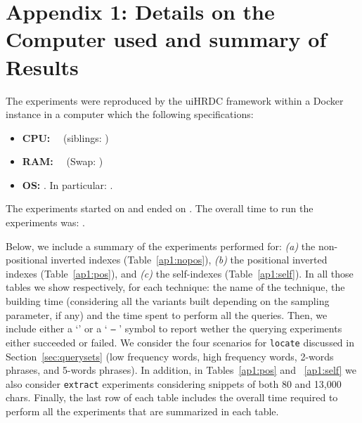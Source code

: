 \documentclass[review]{elsarticle}
\begin{document}

\section{Appendix 1: Details on the Computer used and summary of Results}
\newcommand{\ok}{\checkmark}
\newcommand{\ko}{  \texttt{--} }        
               


The experiments were reproduced by the uiHRDC framework within a Docker instance in a computer which the following specifications:
\begin{itemize}
\item {\bf CPU:} \cpu  ~~(siblings: \nsiblings)
\item {\bf RAM:} \mem  ~~(Swap: \swapmem)
\item {\bf OS:} \osversion. In particular: \osfull.
\end{itemize}
The experiments started on {\em \runinidate} and ended on {\em \runenddate}. The overall time to run the experiments was: {\bf \elapsed}.

\medskip

Below, we include a summary of the experiments performed for: 
{\em (a)} the non-positional inverted indexes (Table~\ref{ap1:nopos}),
{\em (b)} the positional inverted indexes (Table~\ref{ap1:pos}), and 
{\em (c)} the self-indexes (Table~\ref{ap1:self}). In all those tables we show respectively, for each technique: 
the name of the technique, the building time (considering all the variants built depending on the sampling parameter, if any) and the time spent to perform all the queries.
Then, we include either a `\ok' or a `\ko' symbol to report wether the querying experiments either succeeded or failed. We consider the four scenarios for \texttt{locate} discussed in Section~\ref{sec:querysets}
(low frequency words, high frequency words, 2-words phrases, and 5-words phrases). In addition, in Tables~\ref{ap1:pos} and ~\ref{ap1:self} we also consider \texttt{extract} experiments considering snippets of both 80 and 13,000 chars. 
Finally, the last row of each table includes the overall time required to perform all the experiments that are summarized in each table.






%


\end{document}
